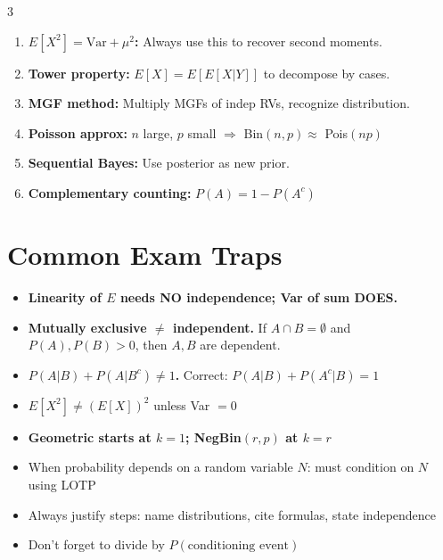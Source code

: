 \documentclass[10pt,landscape]{article}
\begin{document}
\begin{multicols}{3}
\begin{enumerate}[leftmargin=*,noitemsep]
\item \textbf{$E[X^2] = \text{Var} + \mu^2$:} Always use this to recover second moments.

\item \textbf{Tower property:} $E[X] = E[E[X | Y]]$ to decompose by cases.

\item \textbf{MGF method:} Multiply MGFs of indep RVs, recognize distribution.

\item \textbf{Poisson approx:} $n$ large, $p$ small $\Rightarrow$ Bin$(n, p) \approx$ Pois$(np)$

\item \textbf{Sequential Bayes:} Use posterior as new prior.

\item \textbf{Complementary counting:} $P(A) = 1 - P(A^c)$
\end{enumerate}

\section{Common Exam Traps}

\begin{itemize}[leftmargin=*,noitemsep]
\item \textbf{Linearity of $E$ needs NO independence; Var of sum DOES.}

\item \textbf{Mutually exclusive $\neq$ independent.} If $A \cap B = \emptyset$ and $P(A), P(B) > 0$, then $A, B$ are dependent.

\item \textbf{$P(A | B) + P(A | B^c) \neq 1$.} Correct: $P(A | B) + P(A^c | B) = 1$

\item \textbf{$E[X^2] \neq (E[X])^2$} unless Var $= 0$

\item \textbf{Geometric starts at $k = 1$; NegBin$(r, p)$ at $k = r$}

\item When probability depends on a random variable $N$: must condition on $N$ using LOTP

\item Always justify steps: name distributions, cite formulas, state independence

\item Don't forget to divide by $P(\text{conditioning event})$


\end{itemize}
\end{multicols}
\end{document}
